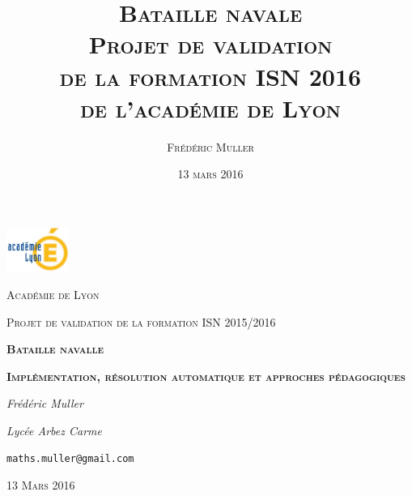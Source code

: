 \title{\Huge{\textsc{Bataille navale}}\\ \medskip \medskip\medskip\medskip \large{\textsc{Projet de validation\\de la formation ISN 2016\\de l'académie de Lyon}}}


\author{\textsc{Frédéric Muller}}
\date{\vfill \textsc{13 mars 2016}} 

\pagestyle{empty}

\begin{titlepage}
	\centering
	\includegraphics[width=0.15\textwidth]{./media/academie.jpg}\par\vspace{1cm}
	{\scshape\LARGE Académie de Lyon \par}
	\vspace{1cm}
	{\scshape\Large Projet de validation de la formation ISN 2015/2016\par}
	\vspace{2.5cm}
	{\Huge\bfseries\scshape Bataille navalle\par}
	\vspace{0.4cm}
	{\Large\bfseries\scshape Implémentation, résolution automatique et approches pédagogiques\par}
	\vspace{2.5cm}
	{\Large\itshape Frédéric Muller\par}{\large\itshape Lycée Arbez Carme\par}
	\medskip	
	{\large\texttt{maths.muller@gmail.com}\par}


	\vfill

	{\scshape\large 13 Mars 2016\par}
\end{titlepage}



